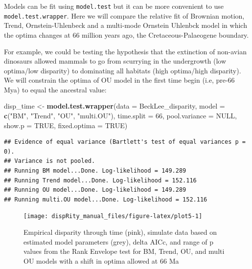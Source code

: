 \documentclass[]{book}
\newenvironment{Shaded}{\begin{snugshade}}{\end{snugshade}}
\newcommand{\DataTypeTok}[1]{\textcolor[rgb]{0.13,0.29,0.53}{#1}}
\newcommand{\DecValTok}[1]{\textcolor[rgb]{0.00,0.00,0.81}{#1}}
\newcommand{\KeywordTok}[1]{\textcolor[rgb]{0.13,0.29,0.53}{\textbf{#1}}}
\newcommand{\NormalTok}[1]{#1}
\newcommand{\OtherTok}[1]{\textcolor[rgb]{0.56,0.35,0.01}{#1}}
\newcommand{\StringTok}[1]{\textcolor[rgb]{0.31,0.60,0.02}{#1}}
\begin{document}
Models can be fit using \texttt{model.test} but it can be more convenient to use \texttt{model.test.wrapper}.
Here we will compare the relative fit of Brownian motion, Trend, Ornstein-Uhlenbeck and a multi-mode Ornstein Uhlenbck model in which the optima changes at 66 million years ago, the Cretaceous-Palaeogene boundary.

For example, we could be testing the hypothesis that the extinction of non-avian dinosaurs allowed mammals to go from scurrying in the undergrowth (low optima/low disparity) to dominating all habitats (high optima/high disparity).
We will constrain the optima of OU model in the first time begin (i.e, pre-66 Mya) to equal the ancestral value:

\begin{Shaded}
\begin{Highlighting}[]
\NormalTok{disp_time <-}\StringTok{ }\KeywordTok{model.test.wrapper}\NormalTok{(}\DataTypeTok{data =}\NormalTok{ BeckLee_disparity,}
                        \DataTypeTok{model =} \KeywordTok{c}\NormalTok{(}\StringTok{"BM"}\NormalTok{, }\StringTok{"Trend"}\NormalTok{, }\StringTok{"OU"}\NormalTok{, }\StringTok{"multi.OU"}\NormalTok{),}
                                \DataTypeTok{time.split =} \DecValTok{66}\NormalTok{,}
                                \DataTypeTok{pool.variance =} \OtherTok{NULL}\NormalTok{,}
                                \DataTypeTok{show.p =} \OtherTok{TRUE}\NormalTok{,}
                                \DataTypeTok{fixed.optima =} \OtherTok{TRUE}\NormalTok{)}
\end{Highlighting}
\end{Shaded}

\begin{verbatim}
## Evidence of equal variance (Bartlett's test of equal variances p = 0).
## Variance is not pooled.
## Running BM model...Done. Log-likelihood = 149.289
## Running Trend model...Done. Log-likelihood = 152.116
## Running OU model...Done. Log-likelihood = 149.289
## Running multi.OU model...Done. Log-likelihood = 152.116
\end{verbatim}

\begin{figure}

{\centering \texttt{[image: dispRity\_manual\_files/figure-latex/plot5-1]} 

}

\caption{Empirical disparity through time (pink), simulate data based on estimated model parameters (grey), delta AICc, and range of p values from the Rank Envelope test for BM, Trend, OU, and multi OU models with a shift in optima allowed at 66 Ma}\label{fig:plot5}
\end{figure}
\end{document}
